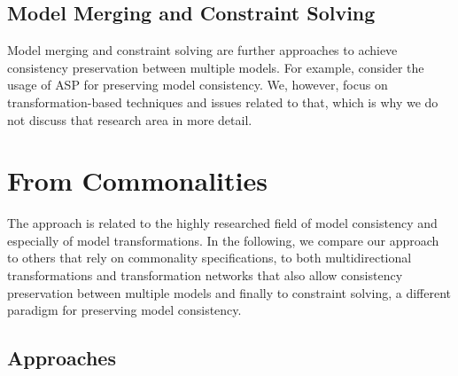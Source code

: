 \subsection*{Model Merging and Constraint Solving} 
Model merging and constraint solving are further approaches to achieve consistency preservation between multiple models.
For example, \textcite{eramo2008a} consider the usage of \ac{ASP} for preserving model consistency.
We, however, focus on transformation-based techniques and issues related to that,
which is why we do not discuss that research area in more detail.





\section{From Commonalities}

The \commonalities approach is related to the highly researched field of model consistency and especially of model 
transformations.
In the following, we compare our approach to others that rely on commonality specifications, to both multidirectional transformations and transformation networks that also allow consistency preservation between multiple models and finally to constraint solving, a different paradigm for preserving model consistency.

\subsection*{\commonality Approaches}


